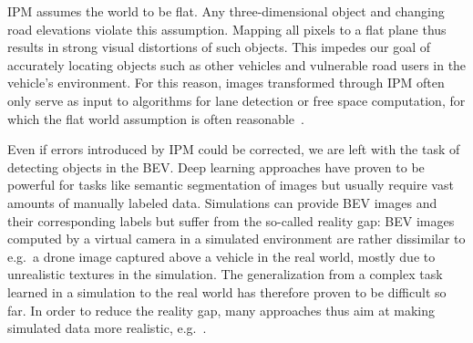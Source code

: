 \documentclass[a4paper, 10pt, conference]{ieeeconf}
\begin{document}
IPM assumes the world to be flat. Any three-dimensional object and changing road elevations violate this assumption. Mapping all pixels to a flat plane thus results in strong visual distortions of such objects. This impedes our goal of accurately locating objects such as other vehicles and vulnerable road users in the vehicle's environment. For this reason, images transformed through IPM often only serve as input to algorithms for lane detection or free space computation, for which the flat world assumption is often reasonable~\cite{BarHillelEtAl_RecentProgressRoad_2014}.

Even if errors introduced by IPM could be corrected, we are left with the task of detecting objects in the BEV. Deep learning approaches have proven to be powerful for tasks like semantic segmentation of images but usually require vast amounts of manually labeled data. Simulations can provide BEV images and their corresponding labels but suffer from the so-called reality gap: BEV images computed by a virtual camera in a simulated environment are rather dissimilar to e.g.\ a drone image captured above a vehicle in the real world, mostly due to unrealistic textures in the simulation. The generalization from a complex task learned in a simulation to the real world has therefore proven to be difficult so far. In order to reduce the reality gap, many approaches thus aim at making simulated data more realistic, e.g.~\cite{ZhaoEtAl_MultiSourceDomain_2019}. 
\end{document}

